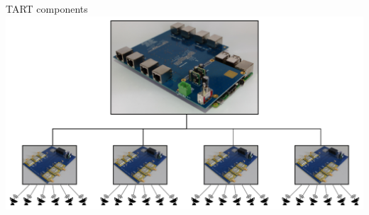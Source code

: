 \documentclass[ignorenonframetext]{beamer}
\begin{document}
 
\begin{frame}{TART components}
  \includegraphics[width=\linewidth]{fig/tart_overview.pdf}
\end{frame}
\end{document}

